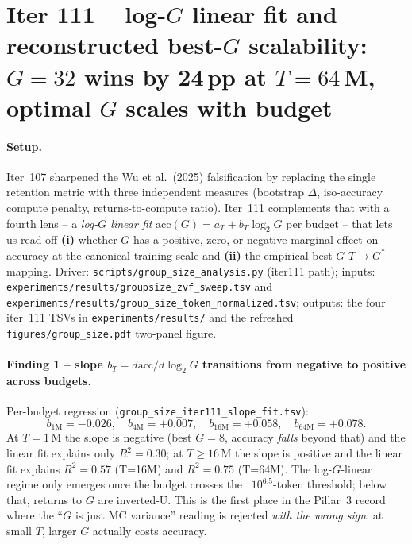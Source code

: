 \section{Iter 111 -- log-$G$ linear fit and reconstructed best-$G$ scalability:
$G{=}32$ wins by 24\,pp at $T{=}64$\,M, optimal $G$ scales with budget}
\label{sec:group-size-iter111}

\paragraph{Setup.}
Iter~107 sharpened the Wu et al.\ (2025) falsification by replacing
the single retention metric with three independent measures
(bootstrap $\Delta$, iso-accuracy compute penalty, returns-to-compute
ratio).  Iter~111 complements that with a fourth lens -- a
\emph{log-$G$ linear fit} $\mathrm{acc}(G) = a_T + b_T \log_2 G$ per
budget -- that lets us read off \textbf{(i)} whether $G$ has a
positive, zero, or negative marginal effect on accuracy at the
canonical training scale and \textbf{(ii)} the empirical best $G$
$T\to G^*$ mapping.  Driver:
\texttt{scripts/group\_size\_analysis.py} (iter111 path); inputs:
\texttt{experiments/results/groupsize\_zvf\_sweep.tsv} and
\texttt{experiments/results/group\_size\_token\_normalized.tsv};
outputs: the four iter~111 TSVs in \texttt{experiments/results/} and
the refreshed \texttt{figures/group\_size.pdf} two-panel figure.

\paragraph{Finding 1 -- slope $b_T = d\mathrm{acc}/d\log_2 G$
transitions from negative to positive across budgets.}
Per-budget regression (\texttt{group\_size\_iter111\_slope\_fit.tsv}):
\[
b_{1\mathrm{M}}{=}{-0.026},\quad
b_{4\mathrm{M}}{=}{+0.007},\quad
b_{16\mathrm{M}}{=}{+0.058},\quad
b_{64\mathrm{M}}{=}{+0.078}.
\]
At $T{=}1\,$M the slope is negative (best $G{=}8$, accuracy
\emph{falls} beyond that) and the linear fit explains only $R^2{=}0.30$;
at $T{\ge}16\,$M the slope is positive and the linear fit explains
$R^2{=}0.57$ (T{=}16M) and $R^2{=}0.75$ (T{=}64M).  The
log-$G$-linear regime only emerges once the budget crosses the
~$10^{6.5}$-token threshold; below that, returns to $G$ are inverted-U.
This is the first place in the Pillar~3 record where the
``$G$ is just MC variance'' reading is rejected \emph{with the wrong
sign}: at small $T$, larger $G$ actually costs accuracy.

